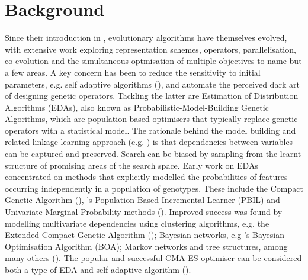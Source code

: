 \documentclass[twoside]{article}
\begin{document}
\section{Background}

Since their introduction in \cite{holland1975adaptation}, evolutionary algorithms have themselves evolved, with extensive work exploring representation schemes, operators, parallelisation, co-evolution and the simultaneous optmisation of multiple objectives to name but a few areas. A key concern has been to reduce the sensitivity to initial parameters, e.g. self adaptive algorithms (\cite{back1993overview}), and automate the perceived dark art of designing genetic operators. Tackling the latter are Estimation of Distribution Algorithms (EDAs), also known as Probabilistic-Model-Building Genetic Algorithms, which are population based optimisers that typically replace genetic operators with a statistical model. The rationale behind the model building and related linkage learning approach (e.g. \cite{thierens2010linkage,harik1999linkage}) is that dependencies between variables can be captured and preserved. Search can be biased by sampling from the learnt structure of promising areas of the search space. Early work on EDAs concentrated on methods that explicitly modelled the probabilities of features occurring independently in a population of genotypes. These include the Compact Genetic Algorithm (\cite{harik1999compact}), \cite{baluja1994population}'s Population-Based Incremental Learner (PBIL) and Univariate Marginal Probability methods (\cite{pelikan2002survey}). Improved success was found by modelling multivariate dependencies using clustering algorithms, e.g. the Extended Compact Genetic Algorithm (\cite{harik1999linkage}); Bayesian networks, e.g \cite{pelikan2002scalability}'s Bayesian Optimisation Algorithm (BOA); Markov networks and tree structures, among many others (\cite{pelikan2002survey}). The popular and successful CMA-ES optimiser can be considered both a type of EDA and self-adaptive algorithm (\cite{hansen2003reducing}). 
\end{document}
